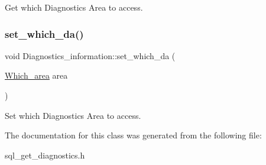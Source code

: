 Get which Diagnostics Area to access. \mbox{\label{classDiagnostics__information_a6028d068edb45a088afe02639c4cbab7}} 
\subsubsection{\texorpdfstring{set\+\_\+which\+\_\+da()}{set\_which\_da()}}
{\footnotesize\ttfamily void Diagnostics\+\_\+information\+::set\+\_\+which\+\_\+da (\begin{DoxyParamCaption}\item[{\mbox{\hyperlink{classDiagnostics__information_a87e497725c87366dd3af8cafe74fc624}{Which\+\_\+area}}}]{area }\end{DoxyParamCaption})\hspace{0.3cm}{\ttfamily [inline]}}

Set which Diagnostics Area to access. 

The documentation for this class was generated from the following file\+:\begin{DoxyCompactItemize}
\item 
sql\+\_\+get\+\_\+diagnostics.\+h\end{DoxyCompactItemize}
